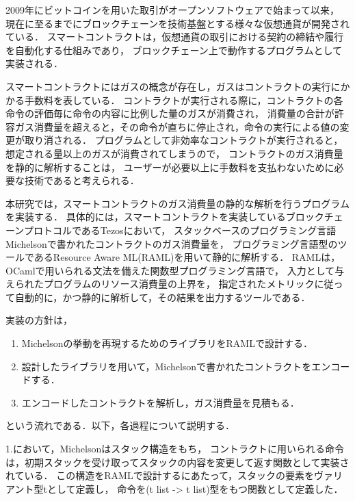 \documentclass{kuisthesis}
\date{2021年2月2日}
\begin{document}
\maketitle

\begin{jabstract}
2009年にビットコインを用いた取引がオープンソフトウェアで始まって以来，
現在に至るまでにブロックチェーンを技術基盤とする様々な仮想通貨が開発されている．
スマートコントラクトは，仮想通貨の取引における契約の締結や履行を自動化する仕組みであり，
ブロックチェーン上で動作するプログラムとして実装される．

スマートコントラクトにはガスの概念が存在し，ガスはコントラクトの実行にかかる手数料を表している．
コントラクトが実行される際に，コントラクトの各命令の評価毎に命令の内容に比例した量のガスが消費され，
消費量の合計が許容ガス消費量を超えると，その命令が直ちに停止され，命令の実行による値の変更が取り消される．
プログラムとして非効率なコントラクトが実行されると，想定される量以上のガスが消費されてしまうので，
コントラクトのガス消費量を静的に解析することは，
ユーザーが必要以上に手数料を支払わないために必要な技術であると考えられる．

本研究では，スマートコントラクトのガス消費量の静的な解析を行うプログラムを実装する．
具体的には，スマートコントラクトを実装しているブロックチェーンプロトコルであるTezosにおいて，
スタックベースのプログラミング言語Michelsonで書かれたコントラクトのガス消費量を，
プログラミング言語型のツールであるResource Aware ML(RAML)を用いて静的に解析する．
RAMLは，OCamlで用いられる文法を備えた関数型プログラミング言語で，
入力として与えられたプログラムのリソース消費量の上界を，
指定されたメトリックに従って自動的に，かつ静的に解析して，その結果を出力するツールである．

実装の方針は，
\begin{enumerate}
  \item Michelsonの挙動を再現するためのライブラリをRAMLで設計する．
  \item 設計したライブラリを用いて，Michelsonで書かれたコントラクトをエンコードする．
  \item エンコードしたコントラクトを解析し，ガス消費量を見積もる．
\end{enumerate}
という流れである．以下，各過程について説明する．


1.において，Michelsonはスタック構造をもち，
コントラクトに用いられる命令は，初期スタックを受け取ってスタックの内容を変更して返す関数として実装されている．
この構造をRAMLで設計するにあたって，スタックの要素をヴァリアント型tとして定義し，
命令を(t list -> t list)型をもつ関数として定義した．


\end{jabstract}
\end{document}
